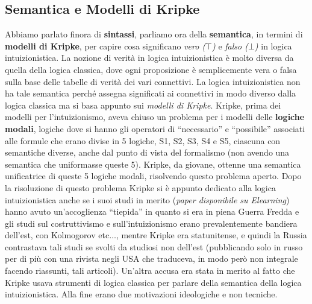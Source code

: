 \documentclass[a4paper,12pt, oneside]{book}
\begin{document}
\subsection{Semantica e Modelli di Kripke}
Abbiamo parlato finora di \textbf{sintassi}, parliamo ora della
\textbf{semantica}, in termini di \textbf{modelli di Kripke}, per capire cosa
significano \textit{vero ($\top$)} e \textit{falso ($\bot$)} in logica
intuizionistica. La nozione di verità in logica intuizionistica è molto diversa
da quella della logica classica, dove ogni proposizione è semplicemente vera o
falsa sulla base delle tabelle di verità dei vari connettivi. La logica
intuizionistica non ha tale semantica perché assegna significati ai connettivi
in modo diverso dalla logica classica ma si basa appunto sui \textit{modelli di
  Kripke}. Kripke, prima dei modelli per l'intuizionismo, aveva chiuso un
problema per i modelli delle \textbf{logiche modali}, logiche dove si hanno gli
operatori di ``necessario'' e ``possibile'' associati alle formule che erano
divise in 5 logiche, S1, S2, S3, S4 e S5, ciascuna con semantiche diverse, anche
dal punto di vista del formalismo (non avendo una semantica che uniformasse
queste 5). Kripke, da giovane, ottenne una semantica unificatrice di queste 5
logiche modali, risolvendo questo problema aperto. Dopo la risoluzione di questo
problema Kripke si è appunto dedicato alla logica intuizionistica anche se i
suoi studi in merito (\textit{paper disponibile su Elearning}) hanno avuto
un'accoglienza ``tiepida'' in quanto si era in piena Guerra Fredda e gli studi
sul costruttivismo e sull'intuizionismo erano prevalentemente bandiera dell'est,
con Kolmogorov etc$\ldots$, mentre Kripke era statunitense, e quindi la Russia
contrastava tali studi se svolti da studiosi non dell'est (pubblicando solo in
russo per di più con una rivista negli USA che traduceva, in modo però non
integrale facendo riassunti, tali articoli). Un'altra accusa era
stata in merito al fatto che Kripke usava strumenti di logica classica per
parlare della semantica della logica intuizionistica. Alla fine erano due
motivazioni ideologiche e non tecniche.
\end{document}
